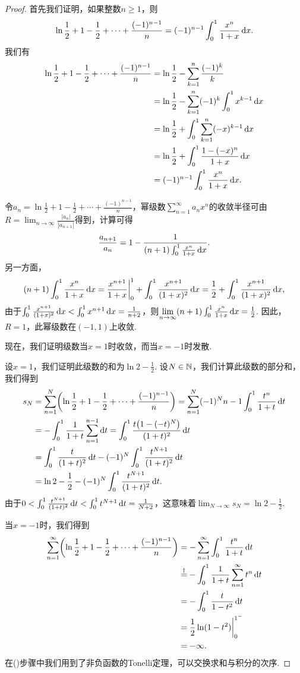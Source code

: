 \begin{proof}
  首先我们证明，如果整数$n\ge1$，则
  \[
    \ln\frac12 + 1 - \frac12 + \cdots + \frac{(-1)^{n-1}}n = (-1)^{n-1}\int_0^1 \frac{x^n}{1+x} \mathop{}\!\mathrm d x .
  \]
  我们有
  \begin{align*}
    \ln\frac12 + 1 - \frac12 + \cdots + \frac{(-1)^{n-1}}n & =  \ln\frac12 - \sum_{k=1}^n \frac{(-1)^k}k \\
    & = \ln\frac12 - \sum_{k=1}^n(-1)^k\int_0^1 x^{k-1} \mathop{}\!\mathrm d x \\
    & = \ln\frac12 + \int_0^1\sum_{k=1}^n(-x)^{k-1} \mathop{}\!\mathrm d x \\
    & = \ln\frac12 + \int_0^1 \frac{1-(-x)^n}{1+x} \mathop{}\!\mathrm d x \\
    & = (-1)^{n-1} \int_0^1 \frac{x^n}{1+x} \mathop{}\!\mathrm d x.
  \end{align*}

  令$a_n=\ln\frac12 + 1 - \frac12 + \cdots + \frac{(-1)^{n-1}}n$，幂级数$\sum_{n=1}^\infty a_nx^n$的收敛半径可由$R=\lim_{n\to\infty}\frac{|a_n|}{|a_{n+1}|}$得到，计算可得
  \[
    \frac{a_{n+1}}{a_n} = 1 - \frac1{(n+1)\int_0^1\frac{x^n}{1+x} \mathop{}\!\mathrm d x}.
  \]
  另一方面，
  \[
    (n+1)\int_0^1\frac{x^n}{1+x} \mathop{}\!\mathrm d x =
    \frac{x^{n+1}}{1+x} \bigg|_0^1 + \int_0^1 \frac{x^{n+1}}{(1+x)^2} \mathop{}\!\mathrm d x = \frac12
    + \int_0^1 \frac{x^{n+1}}{(1+x)^2} \mathop{}\!\mathrm d x,
  \]
  由于$\int_0^1 \frac{x^{n+1}}{(1+x)^2} \mathop{}\!\mathrm d x<\int_0^1x^{n+1}\mathop{}\!\mathrm d x=\frac1{n+2}$，则$\lim_{n\to\infty}
  (n+1)\int_0^1\frac{x^n}{1+x} \dif x=\frac12$. 因此，$R=1$，此幂级数在$(-1,1)$上收敛.

  现在，我们证明级数当$x=1$时收敛，而当$x=-1$时发散.

  设$x=1$，我们证明此级数的和为$\ln2-\frac12$. 设$N\in\mathbb N$，我们计算此级数的部分和，我们得到
  \begin{align*}
    s_N & = \sum_{n=1}^N \left( \ln\frac12 + 1 - \frac12 + \cdots + \frac{(-1)^{n-1}}n \right) = \sum_{n=1}^N(-1)^N{n-1} \int_0^1 \frac{t^n}{1+t} \dif t \\
    & = -\int_0^1 \frac1{1+t} \sum_{n=1}^{n-1} \dif t = \int_0^1 \frac{t\big(1-(-t)^N\big)}{(1+t)^2} \dif t \\
    & = \int_0^1 \frac t{(1+t)^2} \dif t - (-1)^N \int_0^1 \frac{t^{N+1}}{(1+t)^2} \dif t \\
    & = \ln2 - \frac12 - (-1)^N\int_0^1 \frac{t^{N+1}}{(1+t)^2} \dif t.
  \end{align*}
  由于$0<\int_0^1\frac{t^{N+1}}{(1+t)^2} \mathop{}\!\mathrm d t<\int_0^1t^{N+1}\mathop{}\!\mathrm d t=\frac1{N+2}$，这意味着$\lim_{N\to\infty}s_N=\ln2-\frac12$.

  当$x=-1$时，我们得到
  \begin{align*}
    \sum_{n=1}^\infty \left( \ln\frac12 + 1 - \frac12 + \cdots + \frac{(-1)^{n-1}}n \right) & = -\sum_{n=1}^\infty \int_0^1 \frac{t^n}{1+t} \dif t \\
    & \overset{\dag}{=} - \int_0^1\frac1{1+t}\sum_{n=1}^\infty t^n \dif t \\
    & = - \int_0^1 \frac t{1-t^2} \dif t \\
    & = \frac12\ln(1 - t^2) \bigg|_0^{1^-} \\
    & = -\infty.
  \end{align*}
  在(\dag)步骤中我们用到了非负函数的Tonelli定理，可以交换求和与积分的次序.


\end{proof}
